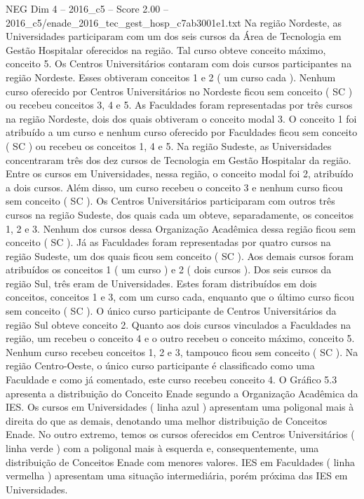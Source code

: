 \begin{textsample}{NEG Dim 4 – 2016\_c5 – Score 2.00 – 2016\_c5/enade\_2016\_tec\_gest\_hosp\_c7ab3001e1.txt}
Na região Nordeste, as Universidades participaram com um dos seis cursos da Área de Tecnologia em Gestão Hospitalar oferecidos na região.
Tal curso obteve conceito máximo, conceito 5.
Os Centros Universitários contaram com dois cursos participantes na região Nordeste.
Esses obtiveram conceitos 1 e 2 ( um curso cada ).
Nenhum curso oferecido por Centros Universitários no Nordeste ficou sem conceito ( SC ) ou recebeu conceitos 3, 4 e 5.
As Faculdades foram representadas por três cursos na região Nordeste, dois dos quais obtiveram o conceito modal 3.
O conceito 1 foi atribuído a um curso e nenhum curso oferecido por Faculdades ficou sem conceito ( SC ) ou recebeu os conceitos 1, 4 e 5.
Na região Sudeste, as Universidades concentraram três dos dez cursos de Tecnologia em Gestão Hospitalar da região.
Entre os cursos em Universidades, nessa região, o conceito modal foi 2, atribuído a dois cursos.
Além disso, um curso recebeu o conceito 3 e nenhum curso ficou sem conceito ( SC ).
Os Centros Universitários participaram com outros três cursos na região Sudeste, dos quais cada um obteve, separadamente, os conceitos 1, 2 e 3.
Nenhum dos cursos dessa Organização Acadêmica dessa região ficou sem conceito ( SC ).
Já as Faculdades foram representadas por quatro cursos na região Sudeste, um dos quais ficou sem conceito ( SC ).
Aos demais cursos foram atribuídos os conceitos 1 ( um curso ) e 2 ( dois cursos ).
Dos seis cursos da região Sul, três eram de Universidades.
Estes foram distribuídos em dois conceitos, conceitos 1 e 3, com um curso cada, enquanto que o último curso ficou sem conceito ( SC ).
O único curso participante de Centros Universitários da região Sul obteve conceito 2.
Quanto aos dois cursos vinculados a Faculdades na região, um recebeu o conceito 4 e o outro recebeu o conceito máximo, conceito 5.
Nenhum curso recebeu conceitos 1, 2 e 3, tampouco ficou sem conceito ( SC ).
Na região Centro-Oeste, o único curso participante é classificado como uma Faculdade e como já comentado, este curso recebeu conceito 4.
O Gráfico 5.3 apresenta a distribuição do Conceito Enade segundo a Organização Acadêmica da IES.
Os cursos em Universidades ( linha azul ) apresentam uma poligonal mais à direita do que as demais, denotando uma melhor distribuição de Conceitos Enade.
No outro extremo, temos os cursos oferecidos em Centros Universitários ( linha verde ) com a poligonal mais à esquerda e, consequentemente, uma distribuição de Conceitos Enade com menores valores.
IES em Faculdades ( linha vermelha ) apresentam uma situação intermediária, porém próxima das IES em Universidades.

\end{textsample}
